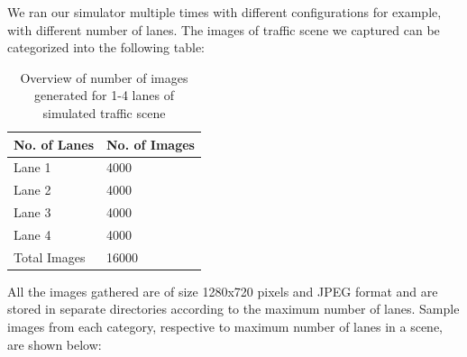 \par
We ran our simulator multiple times with different configurations for example, with different number of lanes. The images of traffic scene we captured can be categorized into the following table:
\begin{table}[H]
\centering
\begin{tabular}{l | l }
No. of Lanes & No. of Images\\
\hline
Lane 1 & 4000 \\
Lane 2 & 4000 \\
Lane 3 & 4000 \\
Lane 4 & 4000 \\
\hline
Total Images & 16000
\end{tabular}
\caption{Overview of number of images generated for 1-4 lanes of simulated traffic scene}
\label{dataset_count}
\end{table}
All the images gathered are of size 1280x720 pixels and JPEG format and are stored in separate directories according to the maximum number of lanes. Sample images from each category, respective to maximum number of lanes in a scene, are shown below:
